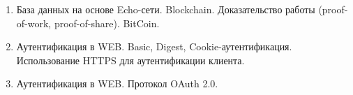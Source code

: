 \begin{enumerate}
    \item База данных на основе Echo-сети. Blockchain. Доказательство работы (proof-of-work, proof-of-share). BitCoin.
    \item Аутентификация в WEB. Basic, Digest, Cookie-аутентификация. Использование HTTPS для аутентификации клиента.
    \item Аутентификация в WEB. Протокол OAuth 2.0.

\end{enumerate}